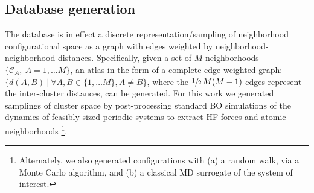 \documentclass[journal=jctcce,manuscript=article]{achemso}
\newcommand{\neighborhood}{\mathcal{C}}
\newcommand{\Xs}{\mathsf{X}}
\newcommand{\Ys}{\mathsf{Y}}
\begin{document}
\subsection{Database generation} \label{sec:database}

The database is in effect a discrete representation/sampling of neighborhood configurational space as a graph with edges weighted by neighborhood-neighborhood distances.
Specifically, given a set of $M$ neighborhoods $\{\neighborhood_A, \ A = 1,\ldots M\}$, an atlas in the form of a complete edge-weighted graph: $\{d(A,B) \ | \ \forall  A,B\in \{ 1, \ldots M \}, A \neq B \}$, where the  $\sfrac{1}{2} \, M (M-1)$ edges represent the inter-cluster distances, can be generated.
For this work we generated samplings of cluster space by post-processing standard BO simulations of the dynamics of feasibly-sized periodic systems to extract HF forces and atomic neighborhoods
\footnote{Alternately, we also generated configurations with (a) a random walk, via a Monte Carlo algorithm, and (b) a classical MD surrogate of the system of interest.}.
\end{document}

